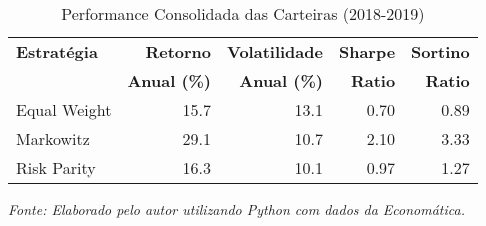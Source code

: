 \begin{table}[H]
\centering
\caption{Performance Consolidada das Carteiras (2018-2019)}
\begin{tabular}{|l|r|r|r|r|}
\hline
\textbf{Estratégia} & \textbf{Retorno} & \textbf{Volatilidade} & \textbf{Sharpe} & \textbf{Sortino} \\
& \textbf{Anual (\%)} & \textbf{Anual (\%)} & \textbf{Ratio} & \textbf{Ratio} \\
\hline
Equal Weight & 15.7 & 13.1 & 0.70 & 0.89 \\
\hline
Markowitz & 29.1 & 10.7 & 2.10 & 3.33 \\
\hline
Risk Parity & 16.3 & 10.1 & 0.97 & 1.27 \\
\hline
\end{tabular}

\textit{Fonte: Elaborado pelo autor utilizando Python com dados da Economática.}
\label{tab:portfolio_performance}
\end{table}
